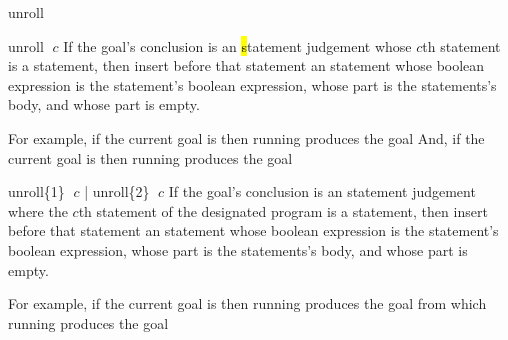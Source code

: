 \begin{tactic}{unroll}
  \begin{tsyntax}{unroll $\;c$}
    If the goal's conclusion is an \hl statement judgement whose $c$th
    statement is a  statement, then insert before that
    statement an  statement whose boolean expression is the
     statement's boolean expression, whose  part is
    the  statements's body, and whose  part is
    empty.

    \medskip For example, if the current goal is
     then
    running 
    produces the goal
    And, if the current goal is
     then
    running 
    produces the goal
  \end{tsyntax}

  \begin{tsyntax}{unroll\{1\} $\;c$ | unroll\{2\} $\;c$}
    If the goal's conclusion is an \prhl statement judgement where the
    $c$th statement of the designated program is a 
    statement, then insert before that statement an  statement
    whose boolean expression is the  statement's boolean
    expression, whose  part is the  statements's
    body, and whose  part is empty.

    \medskip For example, if the current goal is
     then
    running 
    produces the goal
    from which
    running 
    produces the goal
  \end{tsyntax}
\end{tactic}
